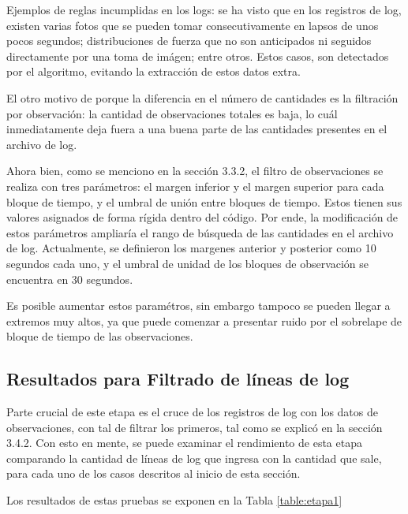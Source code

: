 Ejemplos de reglas incumplidas en los logs: se ha visto que en los registros de log, existen varias fotos que se pueden tomar consecutivamente en lapsos de unos pocos segundos; distribuciones de fuerza que no son anticipados ni seguidos directamente por una toma de imágen; entre otros. Estos casos, son detectados por el algoritmo, evitando la extracción de estos datos extra.

El otro motivo de porque la diferencia en el número de cantidades es la filtración por observación: la cantidad de observaciones totales es baja, lo cuál inmediatamente deja fuera a una buena parte de las cantidades presentes en el archivo de log.

Ahora bien, como se menciono en la sección 3.3.2, el filtro de observaciones se realiza con tres parámetros: el margen inferior y el margen superior para cada bloque de tiempo, y el umbral de unión entre bloques de tiempo. Estos tienen sus valores asignados de forma rígida dentro del código. Por ende, la modificación de estos parámetros ampliaría el rango de búsqueda de las cantidades en el archivo de log. Actualmente, se definieron los margenes anterior y posterior como 10 segundos cada uno, y el umbral de unidad de los bloques de observación se encuentra en 30 segundos.

Es posible aumentar estos paramétros, sin embargo tampoco se pueden llegar a extremos muy altos, ya que puede comenzar a presentar ruido por el sobrelape de bloque de tiempo de las observaciones.

\subsection{Resultados para Filtrado de líneas de log}

Parte crucial de este etapa es el cruce de los registros de log con los datos de observaciones, con tal de filtrar los primeros, tal como se explicó en la sección 3.4.2. Con esto en mente, se puede examinar el rendimiento de esta etapa comparando la cantidad de líneas de log que ingresa con la cantidad que sale, para cada uno de los casos descritos al inicio de esta sección.

Los resultados de estas pruebas se exponen en la Tabla \ref{table:etapa1}


